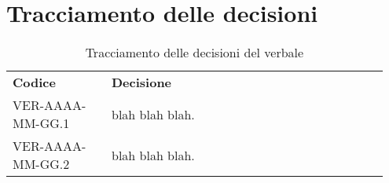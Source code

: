 \documentclass[VER-AAAA-MM-GG.tex]{subfiles}
\begin{document}
\section{Tracciamento delle decisioni}
\begin{table}[H]
	\begin{center}
		\begin{tabu} to 
			\tableHeaderStyle
			\textbf{Codice} & \textbf{Decisione} \\
			VER-AAAA-MM-GG.1 & blah blah blah. \\
			VER-AAAA-MM-GG.2 & blah blah blah. \\
		\end{tabu}
		\caption{Tracciamento delle decisioni del verbale}
	\end{center}
\end{table}
\end{document}
